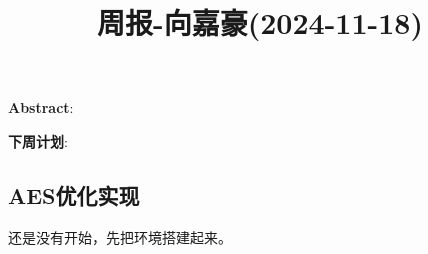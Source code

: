 \documentclass[11pt,a4paper]{article}
\title{周报-向嘉豪(2024-11-18)}
\renewcommand{\maketitle}{
  \begin{center}
    \LARGE\bfseries\thetitle
  \end{center}
}
\begin{document}
\maketitle


\noindent \textbf{Abstract}: 

\noindent \textbf{下周计划}: 

\subsection{AES优化实现}

还是没有开始，先把环境搭建起来。

% 
% 
\end{document}
